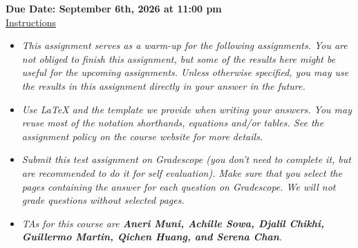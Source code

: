 \documentclass[12pt]{article}
\theoremstyle{definition}
\begin{document}
\fancyhead{}
\fancyfoot{}


\vspace{1cm}

\shorthandoff{:}
{\textbf{Due Date: September 6th, 2026 at 11:00 pm}}\\


\vspace{-0.5cm}
\underline{Instructions}%
\renewcommand{\labelitemi}{\textbullet}

\begin{itemize}
\item \emph{This assignment serves as a warm-up for the following assignments. You are not obliged to finish this assignment, but some of the results here might be useful for the upcoming assignments. Unless otherwise specified, you may use the results in this assignment directly in your answer in the future.}
\item \emph{Use LaTeX and the template we provide when writing your answers.
You may reuse most of the notation shorthands, equations and/or tables.
See the assignment policy on the course website for more details.}
\item \emph{Submit this test assignment on Gradescope (you don't need to complete it, but are recommended to do it for self evaluation). Make sure that you select the pages containing the answer for each question on Gradescope. We will not grade questions without selected pages.}
\item \emph{TAs for this course are \textbf{Aneri Muni, Achille Sowa, Djalil Chikhi, Guillermo Martin, Qichen Huang, and Serena Chan}.}
\end{itemize}
\vspace{0.2cm}
\end{document}
